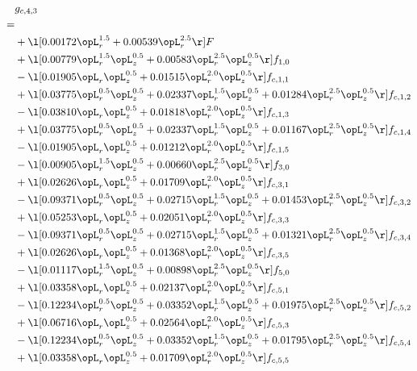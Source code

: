 \begin{alignat}{2} 
\label{eq:g_43_0} 
& g_{c,4,3} \nonumber \\ 
 = \\ 
& + \l[  0.00172 \opL_r^{1.5} +  0.00539 \opL_r^{2.5}  \r] F \nonumber \\ 
& + \l[  0.00779 \opL_r^{1.5} \opL_z^{0.5} +  0.00583 \opL_r^{2.5} \opL_z^{0.5}  \r] f_{1,0} \nonumber \\ 
& - \l[  0.01905 \opL_r \opL_z^{0.5} +  0.01515 \opL_r^{2.0} \opL_z^{0.5}  \r] f_{c,1,1} \nonumber \\ 
& + \l[  0.03775 \opL_r^{0.5} \opL_z^{0.5} +  0.02337 \opL_r^{1.5} \opL_z^{0.5} +  0.01284 \opL_r^{2.5} \opL_z^{0.5}  \r] f_{c,1,2} \nonumber \\ 
& - \l[  0.03810 \opL_r \opL_z^{0.5} +  0.01818 \opL_r^{2.0} \opL_z^{0.5}  \r] f_{c,1,3} \nonumber \\ 
& + \l[  0.03775 \opL_r^{0.5} \opL_z^{0.5} +  0.02337 \opL_r^{1.5} \opL_z^{0.5} +  0.01167 \opL_r^{2.5} \opL_z^{0.5}  \r] f_{c,1,4} \nonumber \\ 
& - \l[  0.01905 \opL_r \opL_z^{0.5} +  0.01212 \opL_r^{2.0} \opL_z^{0.5}  \r] f_{c,1,5} \nonumber \\ 
& - \l[  0.00905 \opL_r^{1.5} \opL_z^{0.5} +  0.00660 \opL_r^{2.5} \opL_z^{0.5}  \r] f_{3,0} \nonumber \\ 
& + \l[  0.02626 \opL_r \opL_z^{0.5} +  0.01709 \opL_r^{2.0} \opL_z^{0.5}  \r] f_{c,3,1} \nonumber \\ 
& - \l[  0.09371 \opL_r^{0.5} \opL_z^{0.5} +  0.02715 \opL_r^{1.5} \opL_z^{0.5} +  0.01453 \opL_r^{2.5} \opL_z^{0.5}  \r] f_{c,3,2} \nonumber \\ 
& + \l[  0.05253 \opL_r \opL_z^{0.5} +  0.02051 \opL_r^{2.0} \opL_z^{0.5}  \r] f_{c,3,3} \nonumber \\ 
& - \l[  0.09371 \opL_r^{0.5} \opL_z^{0.5} +  0.02715 \opL_r^{1.5} \opL_z^{0.5} +  0.01321 \opL_r^{2.5} \opL_z^{0.5}  \r] f_{c,3,4} \nonumber \\ 
& + \l[  0.02626 \opL_r \opL_z^{0.5} +  0.01368 \opL_r^{2.0} \opL_z^{0.5}  \r] f_{c,3,5} \nonumber \\ 
& - \l[  0.01117 \opL_r^{1.5} \opL_z^{0.5} +  0.00898 \opL_r^{2.5} \opL_z^{0.5}  \r] f_{5,0} \nonumber \\ 
& + \l[  0.03358 \opL_r \opL_z^{0.5} +  0.02137 \opL_r^{2.0} \opL_z^{0.5}  \r] f_{c,5,1} \nonumber \\ 
& - \l[  0.12234 \opL_r^{0.5} \opL_z^{0.5} +  0.03352 \opL_r^{1.5} \opL_z^{0.5} +  0.01975 \opL_r^{2.5} \opL_z^{0.5}  \r] f_{c,5,2} \nonumber \\ 
& + \l[  0.06716 \opL_r \opL_z^{0.5} +  0.02564 \opL_r^{2.0} \opL_z^{0.5}  \r] f_{c,5,3} \nonumber \\ 
& - \l[  0.12234 \opL_r^{0.5} \opL_z^{0.5} +  0.03352 \opL_r^{1.5} \opL_z^{0.5} +  0.01795 \opL_r^{2.5} \opL_z^{0.5}  \r] f_{c,5,4} \nonumber \\ 
& + \l[  0.03358 \opL_r \opL_z^{0.5} +  0.01709 \opL_r^{2.0} \opL_z^{0.5}  \r] f_{c,5,5} \nonumber \\ 
\end{alignat} 


